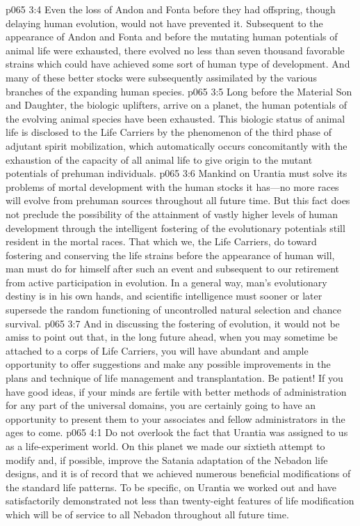 \pc \vs p065 3:4 Even the loss of Andon and Fonta before they had offspring, though delaying human evolution, would not have prevented it. Subsequent to the appearance of Andon and Fonta and before the mutating human potentials of animal life were exhausted, there evolved no less than seven thousand favorable strains which could have achieved some sort of human type of development. And many of these better stocks were subsequently assimilated by the various branches of the expanding human species.
\vs p065 3:5 Long before the Material Son and Daughter, the biologic uplifters, arrive on a planet, the human potentials of the evolving animal species have been exhausted. This biologic status of animal life is disclosed to the Life Carriers by the phenomenon of the third phase of adjutant spirit mobilization, which automatically occurs concomitantly with the exhaustion of the capacity of all animal life to give origin to the mutant potentials of prehuman individuals.
\pc \vs p065 3:6 Mankind on Urantia must solve its problems of mortal development with the human stocks it has---no more races will evolve from prehuman sources throughout all future time. But this fact does not preclude the possibility of the attainment of vastly higher levels of human development through the intelligent fostering of the evolutionary potentials still resident in the mortal races. That which we, the Life Carriers, do toward fostering and conserving the life strains before the appearance of human will, man must do for himself after such an event and subsequent to our retirement from active participation in evolution. In a general way, man’s evolutionary destiny is in his own hands, and scientific intelligence must sooner or later supersede the random functioning of uncontrolled natural selection and chance survival.\plusone
\vs p065 3:7 And in discussing the fostering of evolution, it would not be amiss to point out that, in the long future ahead, when you may sometime be attached to a corps of Life Carriers, you will have abundant and ample opportunity to offer suggestions and make any possible improvements in the plans and technique of life management and transplantation. Be patient! If you have good ideas, if your minds are fertile with better methods of administration for any part of the universal domains, you are certainly going to have an opportunity to present them to your associates and fellow administrators in the ages to come.
\vs p065 4:1 Do not overlook the fact that Urantia was assigned to us as a life\hyp{}experiment world. On this planet we made our sixtieth attempt to modify and, if possible, improve the Satania adaptation of the Nebadon life designs, and it is of record that we achieved numerous beneficial modifications of the standard life patterns. To be specific, on Urantia we worked out and have satisfactorily demonstrated not less than twenty\hyp{}eight features of life modification which will be of service to all Nebadon throughout all future time.
